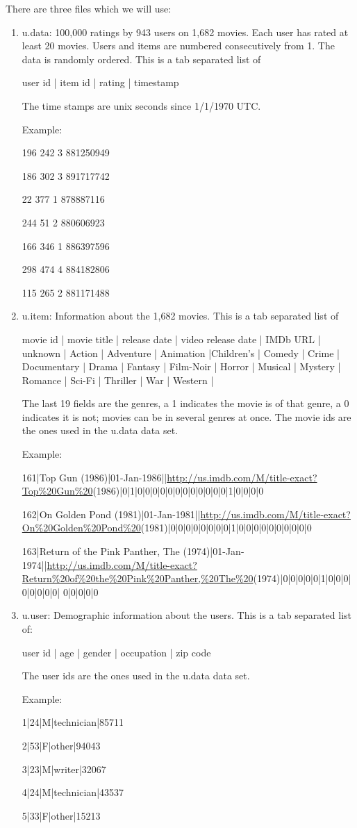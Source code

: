\documentclass{article}
\begin{document}
There are three files which we will use:
\begin{enumerate}
\item{u.data}: 100,000 ratings by 943 users on 1,682 movies. Each user has rated at least 20 movies. Users and items are numbered
consecutively from 1. The data is randomly ordered. This is a tab separated list of 

user id | item id | rating | timestamp

The time stamps are unix seconds since 1/1/1970 UTC.

Example:

196     242     3       881250949

186     302     3       891717742

22      377     1       878887116

244     51      2       880606923

166     346     1       886397596

298     474     4       884182806

115     265     2       881171488

\item{u.item}: Information about the 1,682 movies. This is a tab
separated list of

movie id | movie title | release date | video release date | IMDb URL | unknown | Action | Adventure | Animation |Children's | Comedy | Crime | Documentary | Drama | Fantasy | Film-Noir | Horror | Musical | Mystery | Romance | Sci-Fi | Thriller | War | Western |

The last 19 fields are the genres, a 1 indicates the movie is of
that genre, a 0 indicates it is not; movies can be in several genres
at once. The movie ids are the ones used in the u.data data set.

Example:

161|Top Gun (1986)|01-Jan-1986||\url{http://us.imdb.com/M/title-exact?Top\%20Gun\%20}(1986)|0|1|0|0|0|0|0|0|0|0|0|0|0|0|1|0|0|0|0 

162|On Golden Pond (1981)|01-Jan-1981||\url{http://us.imdb.com/M/title-exact?On\%20Golden\%20Pond\%20}(1981)|0|0|0|0|0|0|0|0|1|0|0|0|0|0|0|0|0|0|0 

163|Return of the Pink Panther, The (1974)|01-Jan-1974||\url{http://us.imdb.com/M/title-exact?Return\%20of\%20the\%20Pink\%20Panther,\%20The\%20}(1974)|0|0|0|0|0|1|0|0|0|0|0|0|0|0| 0|0|0|0|0

\item{u.user}: Demographic information about the users. This is a tab
separated list of:

user id | age | gender | occupation | zip code

The user ids are the ones used in the u.data data set.

Example:

1|24|M|technician|85711 

2|53|F|other|94043 

3|23|M|writer|32067 

4|24|M|technician|43537 

5|33|F|other|15213
 \end{enumerate}
\end{document}
